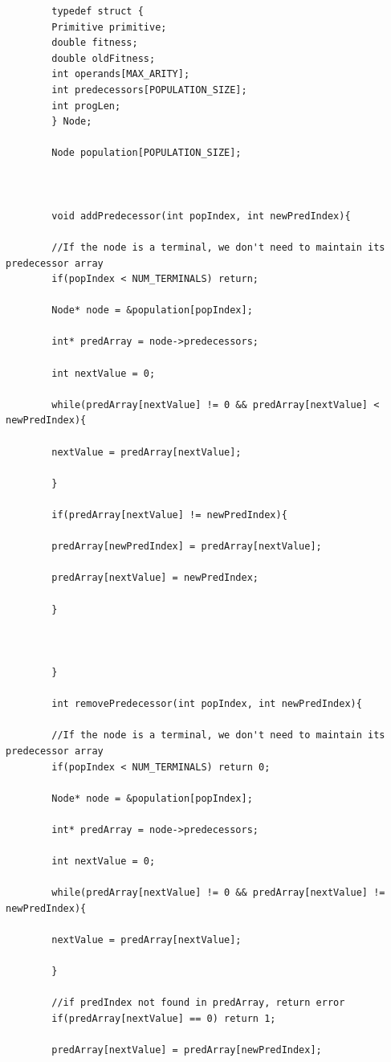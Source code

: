 \documentclass{article}
\begin{document}
\begin{lstlisting}
	    typedef struct {
	    Primitive primitive;
	    double fitness;
	    double oldFitness;
	    int operands[MAX_ARITY];
	    int predecessors[POPULATION_SIZE];
	    int progLen;
	    } Node;
	    
	    Node population[POPULATION_SIZE];
	    
	    
	    
	    void addPredecessor(int popIndex, int newPredIndex){
	    
	    //If the node is a terminal, we don't need to maintain its predecessor array
	    if(popIndex < NUM_TERMINALS) return;
	    
	    Node* node = &population[popIndex];
	    
	    int* predArray = node->predecessors;
	    
	    int nextValue = 0;
	    
	    while(predArray[nextValue] != 0 && predArray[nextValue] < newPredIndex){
	    
	    nextValue = predArray[nextValue];
	    
	    }
	    
	    if(predArray[nextValue] != newPredIndex){
	    
	    predArray[newPredIndex] = predArray[nextValue];
	    
	    predArray[nextValue] = newPredIndex;
	    
	    }
	    
	    
	    
	    }
	    
	    int removePredecessor(int popIndex, int newPredIndex){
	    
	    //If the node is a terminal, we don't need to maintain its predecessor array
	    if(popIndex < NUM_TERMINALS) return 0;
	    
	    Node* node = &population[popIndex];
	    
	    int* predArray = node->predecessors;
	    
	    int nextValue = 0;
	    
	    while(predArray[nextValue] != 0 && predArray[nextValue] != newPredIndex){
	    
	    nextValue = predArray[nextValue];
	    
	    }
	    
	    //if predIndex not found in predArray, return error
	    if(predArray[nextValue] == 0) return 1;
	    
	    predArray[nextValue] = predArray[newPredIndex];
	    

\end{lstlisting}
\end{document}
